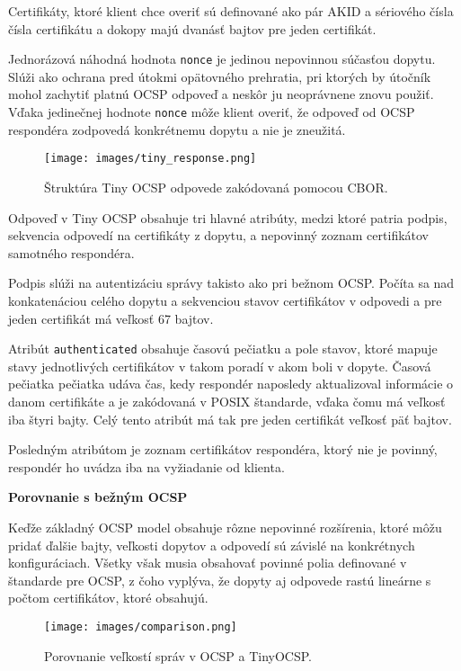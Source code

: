 \documentclass[12pt, twoside]{book}
\newcommand{\subsubsubsection}[1]{%
  \vspace{0.2em}  
  \textbf{#1} \\[0.2em]
  \hspace*{\parindent}
}
\begin{document}
Certifikáty, ktoré klient chce overiť sú definované ako pár AKID a sériového čísla 
čísla certifikátu a dokopy majú dvanásť bajtov pre jeden certifikát.\cite{tiny}

Jednorázová náhodná hodnota \texttt{nonce} je jedinou nepovinnou súčasťou dopytu.  Slúži ako ochrana pred útokmi opätovného prehratia, pri ktorých by útočník mohol zachytiť platnú OCSP odpoveď a neskôr ju neoprávnene znovu použiť. Vďaka jedinečnej hodnote \texttt{nonce} môže klient overiť, že odpoveď od OCSP respondéra zodpovedá konkrétnemu dopytu a nie je zneužitá.\cite{tiny}

\begin{figure}[H]
\centering
\texttt{[image: images/tiny\_response.png]}
\caption{Štruktúra Tiny OCSP odpovede zakódovaná pomocou CBOR.}
\end{figure}

Odpoveď v Tiny OCSP obsahuje tri hlavné atribúty, medzi ktoré patria podpis, sekvencia odpovedí na certifikáty z dopytu, a nepovinný zoznam certifikátov samotného respondéra.\cite{tiny}

Podpis slúži na autentizáciu správy takisto ako pri bežnom OCSP. Počíta sa nad konkatenáciou celého dopytu a sekvenciou stavov certifikátov v odpovedi a pre jeden certifikát má veľkosť 67 bajtov.\cite{tiny}

Atribút \texttt{authenticated} obsahuje časovú pečiatku a pole stavov, ktoré mapuje stavy jednotlivých certifikátov v takom poradí v akom boli v dopyte.
Časová pečiatka pečiatka udáva čas, kedy respondér naposledy aktualizoval informácie o danom certifikáte a je zakódovaná v POSIX štandarde, vďaka čomu má veľkosť iba štyri bajty. Celý tento atribút má tak pre jeden certifikát veľkosť päť bajtov.\cite{tiny}

Posledným atribútom je zoznam certifikátov respondéra, ktorý nie je povinný, respondér ho uvádza iba na vyžiadanie od klienta.


\subsubsubsection{Porovnanie s bežným OCSP}
Keďže základný OCSP model obsahuje rôzne nepovinné rozšírenia, ktoré môžu pridať ďalšie bajty, veľkosti dopytov a odpovedí sú závislé na konkrétnych konfiguráciach. Všetky však musia obsahovať povinné polia definované v štandarde pre OCSP, z čoho vyplýva, že dopyty aj odpovede rastú lineárne s počtom certifikátov, ktoré obsahujú.\cite{tiny}

\begin{figure}[H]
\centering
\texttt{[image: images/comparison.png]}
\caption{Porovnanie veľkostí správ v OCSP a TinyOCSP.}
\end{figure}
\end{document}
